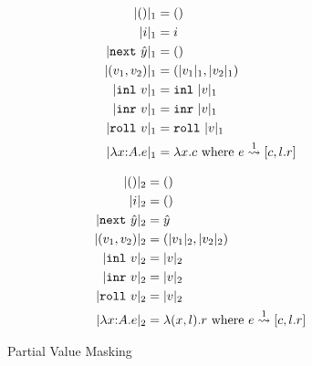 %

\begin{figure*}
\centering
\begin{minipage}[]{10em}
\begin{align*}
\masko {()}			&= () \\
\masko {i}				&= i \\
\masko {\next~\hat y}	&= () \\
\masko {(v_1,v_2)}	&= (\masko {v_1},\masko {v_2}) \\
\masko {\inl~v}		&= \inl~\masko v \\
\masko {\inr~v}		&= \inr~\masko v \\
\masko {\roll~v}		&= \roll~\masko v \\
\masko {\lam xAe}		&= \lambda x.c \text{ where } \splitone e A {c,l.r}
\end{align*}
\end{minipage}
\qquad\qquad
\begin{minipage}[]{10em}
\begin{align*}
\maskt {()}			&= () \\
\maskt {i}				&= () \\
\maskt {\next~\hat y}	&= \hat y \\
\maskt {(v_1,v_2)}	&= (\maskt {v_1},\maskt {v_2}) \\
\maskt {\inl~v}		&= \maskt v \\
\maskt {\inr~v}		&= \maskt v \\
\maskt {\roll~v}		&= \maskt v \\
\maskt {\lam xAe}		&= \lambda (x,l).r \text{ where } \splitone e A {c,l.r}
\end{align*}
\end{minipage}
\caption{Partial Value Masking}
\label{fig:valMask}
\end{figure*}

